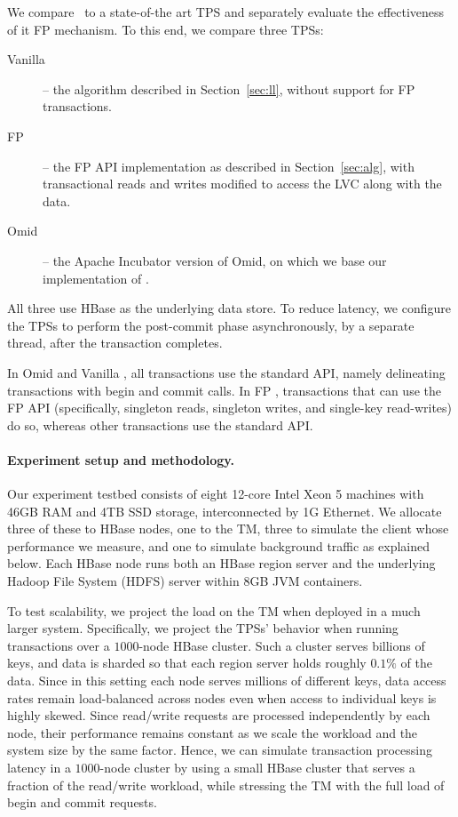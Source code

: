We compare \sys\  to a state-of-the art TPS and separately evaluate the effectiveness of it FP mechanism.
To this end, we compare three TPSs: 
\begin{description}
\item[Vanilla \sys] -- the algorithm described in Section~\ref{sec:ll}, without support for FP transactions.
\item[FP \sys] -- the FP API implementation as described in Section~\ref{sec:alg},
with transactional reads and writes  modified to access the LVC along with the data.
\item[Omid] -- the Apache Incubator version of Omid, on which we base
our implementation of \sys. 
\end{description}

All three use HBase as the underlying data store. To reduce latency,
we configure the TPSs to perform the post-commit phase asynchronously, 
by a separate thread, after the transaction completes.

In Omid and Vanilla \sys, all transactions use the standard API, namely 
delineating transactions with begin and commit calls.
In FP \sys, transactions that can use the FP API (specifically, singleton reads, singleton writes, 
and single-key read-writes) do so, whereas other transactions use the standard API.

\paragraph{Experiment setup and methodology.}

Our experiment testbed consists of eight 12-core Intel Xeon 5 machines with 46GB RAM and 4TB 
SSD storage, interconnected by 1G Ethernet. We allocate three of these to HBase nodes, 
one to the TM, three to simulate the client whose performance we measure, and one to simulate background traffic
as explained below. Each HBase node runs both an HBase region server and the underlying 
Hadoop File System (HDFS) server within 8GB JVM containers. 

To test scalability, we project the load on the TM when deployed in a much larger system. 
Specifically, we project the TPSs' behavior when running transactions over a $1000$-node HBase cluster.
Such a cluster serves billions of keys, and data is sharded so that each region server 
holds roughly $0.1\%$ of the data.
Since in this setting each node serves millions of different keys, 
data access rates remain load-balanced across nodes 
even when access to individual keys is highly skewed. 
Since read/write requests are processed independently by each node, 
their performance remains constant as we scale the workload and the 
system size by the same factor. 
Hence, we can simulate transaction processing latency in 
a $1000$-node cluster
by using a small HBase cluster that serves a fraction of the read/write workload, 
while stressing the TM with the full load of begin and commit requests. 


